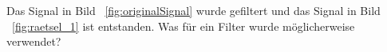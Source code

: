 Das Signal in Bild ~\ref{fig:originalSignal} wurde gefiltert und das Signal in Bild ~\ref{fig:raetsel_1} ist entstanden. Was für ein Filter wurde möglicherweise verwendet?





























